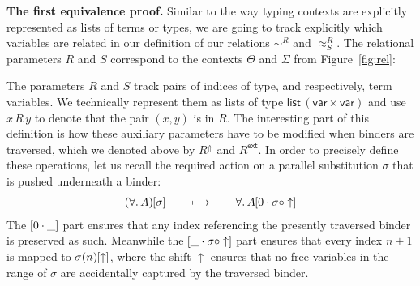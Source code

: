 \documentclass[a4paper,UKenglish]{lipics-v2016}
\newcommand{\ty}{\mathsf{ty}}
\newcommand{\tm}{\mathsf{tm}}
\newcommand{\tyr}{\mathrel{\sim}}
\newcommand{\tmr}{\mathrel{\approx}}
\newcommand{\Rext}[1]{\ensuremath{#1^{\mathsf{ext}}}}
\newcommand{\Rshift}[1]{\ensuremath{#1^{\Uparrow}}}
\newcommand{\Prp}{\ensuremath{\textrm{\textasteriskcentered}}}
\newcommand{\All}{\ensuremath{\forall.\,}}
\newcommand{\Lam}[1]{\ensuremath{\lambda #1.\,}}
\newcommand{\TyLam}{\ensuremath{\Lambda.\,}}
\newcommand{\Prod}[1]{\ensuremath{\Pi #1.\,}}
\newcommand{\subst}[1]{\hphantom{|}\!\![{#1}]}
\newcommand{\scons}{\mathbin{\cdot}}
\newcommand{\scomp}{\mathbin{\circ}}
\newcommand{\shift}{\ensuremath{\uparrow}}
\theoremstyle{plain}
\begin{document}
{\bf The first equivalence proof.}
Similar to the way typing contexts are explicitly represented as lists of terms or types, we are going to track explicitly which variables are related in our definition of our relations $\tyr^R$ and $\tmr^R_S$.
The relational parameters $R$ and $S$ correspond to the contexts $\Theta$ and $\Sigma$ from Figure~\ref{fig:rel}:

\vspace{-.5em}
{\small
{}
}\vspace{-1em}

The parameters $R$ and $S$ track pairs of indices of type, and respectively, term variables.
We technically represent them as lists of type $\mathsf{list}\,(\mathsf{var} \times \mathsf{var})$ and use $x\,R\,y$ to denote that the pair $(x,y)$ is in $R$.
The interesting part of this definition is how these auxiliary parameters have to be modified when binders are traversed, which we denoted above by $\Rshift{R}$ and $\Rext{R}$.
In order to precisely define these operations, let us recall the required action on a parallel substitution $\sigma$ that is pushed underneath a binder:
\begin{align*}
  (\All A)\subst{\sigma} \qquad\longmapsto\qquad \All A\subst{0 \scons \sigma \scomp \shift}
\end{align*}
The $\subst{0 \scons \_}$ part ensures that any index referencing the presently traversed binder is preserved as such.
Meanwhile the $\subst{\_ \scons \sigma \scomp \shift}$ part ensures that every index $n + 1$ is mapped to $\sigma(n)\subst{\shift}$, where the shift $\shift$ ensures that no free variables in the range of $\sigma$ are accidentally captured by the traversed binder.
\end{document}
